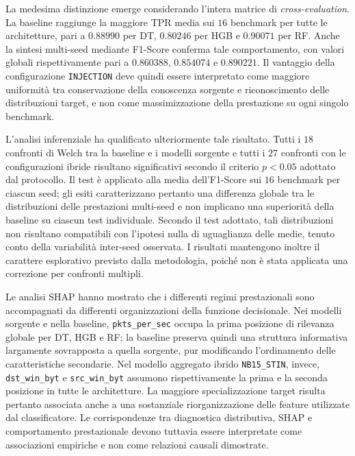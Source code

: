 La medesima distinzione emerge considerando l'intera matrice di \textit{cross-evaluation}. 
La baseline raggiunge la maggiore TPR media sui $16$ benchmark per tutte le architetture, pari a $0.88990$ per DT, $0.80246$ per HGB e $0.90071$ per RF. 
Anche la sintesi multi-seed mediante F1-Score conferma tale comportamento, con valori globali rispettivamente pari a $0.860388$, $0.854074$ e $0.890221$. 
Il vantaggio della configurazione \texttt{INJECTION} deve quindi essere interpretato come maggiore uniformità tra conservazione della conoscenza sorgente e riconoscimento delle distribuzioni target, e non come massimizzazione della prestazione su ogni singolo benchmark.

L'analisi inferenziale ha qualificato ulteriormente tale risultato. 
Tutti i $18$ confronti di Welch tra la baseline e i modelli sorgente e tutti i $27$ confronti con le configurazioni ibride risultano significativi secondo il criterio $p<0.05$ adottato dal protocollo. 
Il test è applicato alla media dell'F1-Score sui $16$ benchmark per ciascun seed; gli esiti caratterizzano pertanto una differenza globale tra le distribuzioni delle prestazioni multi-seed e non implicano una superiorità della baseline su ciascun test individuale. 
Secondo il test adottato, tali distribuzioni non risultano compatibili con l'ipotesi nulla di uguaglianza delle medie, tenuto conto della variabilità inter-seed osservata. 
I risultati mantengono inoltre il carattere esplorativo previsto dalla metodologia, poiché non è stata applicata una correzione per confronti multipli.

Le analisi SHAP hanno mostrato che i differenti regimi prestazionali sono accompagnati da differenti organizzazioni della funzione decisionale. 
Nei modelli sorgente e nella baseline, \texttt{pkts\_per\_sec} occupa la prima posizione di rilevanza globale per DT, HGB e RF; la baseline preserva quindi una struttura informativa largamente sovrapposta a quella sorgente, pur modificando l'ordinamento delle caratteristiche secondarie. 
Nel modello aggregato ibrido \texttt{NB15\_STIN}, invece, \texttt{dst\_win\_byt} e \texttt{src\_win\_byt} assumono rispettivamente la prima e la seconda posizione in tutte le architetture. 
La maggiore specializzazione target risulta pertanto associata anche a una sostanziale riorganizzazione delle feature utilizzate dal classificatore. 
Le corrispondenze tra diagnostica distributiva, SHAP e comportamento prestazionale devono tuttavia essere interpretate come associazioni empiriche e non come relazioni causali dimostrate.

